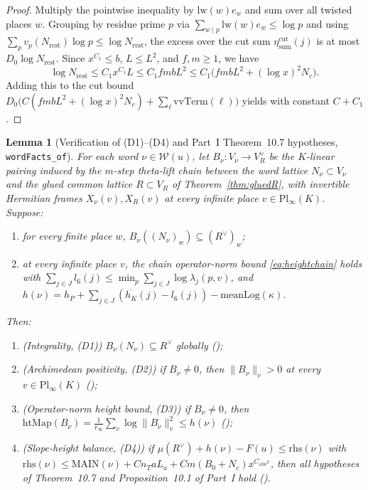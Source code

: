 \documentclass[11pt]{amsart}
\newcommand{\eps}{\varepsilon}
\theoremstyle{plain}
\newtheorem{lemma}[theorem]{Lemma}
\theoremstyle{definition}
\numberwithin{equation}{section}
\begin{document}
\begin{proof}
Multiply the pointwise inequality by $\mathrm{lw}(w)e_w$ and sum over all twisted places $w$.
Grouping by residue prime $p$ via $\sum_{w\mid p}\mathrm{lw}(w)e_w\le\log p$ and using
$\sum_p v_p(N_{\mathrm{rest}})\log p\le\log N_{\mathrm{rest}}$, the excess over the cut sum
$\eta_{\mathrm{sum}}^{\mathrm{cut}}(j)$ is at most $D_0\log N_{\mathrm{rest}}$. Since
$x^{C_1}\le b$, $L\le L^2$, and $f,m\ge1$, we have
\[
\log N_{\mathrm{rest}}\le C_1 x^{C_1} L\le C_1 f m b L^2
\le C_1\bigl(fmbL^2+(\log x)^2 N_c\bigr).
\]
Adding this to the cut bound $D_0\bigl(C(fmbL^2+(\log x)^2 N_c)+\sum_\ell\mathrm{vvTerm}(\ell)\bigr)$
yields  with constant $C+C_1$.
\end{proof}

\begin{lemma}[Verification of (D1)--(D4) and Part~I Theorem~10.7 hypotheses, \texttt{wordFacts\_of}]\label{lem:D1D4}
For each word $\nu\in\mathcal W(u)$, let $B_\nu:V_\nu\to V_R^\vee$ be the $K$-linear pairing
induced by the $m$-step theta-lift chain between the word lattice $N_\nu\subset V_\nu$ and the
glued common lattice $R\subset V_R$ of Theorem~\ref{thm:gluedR}, with invertible Hermitian frames
$X_\nu(v), X_R(v)$ at every infinite place $v\in\mathrm{Pl}_\infty(K)$. Suppose:
\begin{enumerate}[label=(\alph*)]
\item for every finite place $w$, $B_\nu((N_\nu)_w)\subseteq (R^\vee)_w$;
\item at every infinite place $v$, the chain operator-norm bound \eqref{eq:heightchain} holds
  with $\sum_{j\in J} l_6(j)\le\min_p\sum_{j\in J}\log\lambda_j(p,v)$, and
  $h(\nu)=h_P+\sum_{j\in J}(\overline{h_K}(j)-l_6(j))-\mathrm{meanLog}(\kappa)$.
\end{enumerate}
Then:
\begin{enumerate}[label=(\roman*)]
\item \textup{(Integrality, (D1))} $B_\nu(N_\nu)\subseteq R^\vee$ globally ();
\item \textup{(Archimedean positivity, (D2))} if $B_\nu\neq 0$, then $\|B_\nu\|_v>0$ at every
  $v\in\mathrm{Pl}_\infty(K)$ ();
\item \textup{(Operator-norm height bound, (D3))} if $B_\nu\neq 0$, then
  $\mathrm{htMap}(B_\nu)=\frac{1}{r_\infty}\sum_v\log\|B_\nu\|_v^2\le h(\nu)$
  ();
\item \textup{(Slope-height balance, (D4))} if $\mu(R^\vee)+h(\nu)-F(u)\le\mathrm{rhs}(\nu)$ with
  $\mathrm{rhs}(\nu)\le\mathrm{MAIN}(\nu)+C n_T a L_a+C m(B_0+N_c)x^{C_{\mathrm{abs}}\eps}$,
  then all hypotheses of Theorem~10.7 and Proposition~10.1 of Part~I hold ().
\end{enumerate}
\end{lemma}
\end{document}
